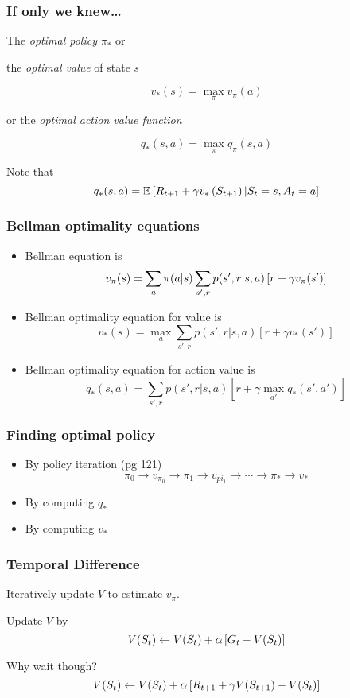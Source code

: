 \documentclass{beamer}
\begin{document}
\frame
{
   \frametitle{If only we knew\dots}
  
   The \textit{optimal policy} $\pi_*$ or
   
   the \textit{optimal value} of state $s$
   
   $$v_* (s) = \max_\pi v_\pi(a)$$
   
   or the \textit{optimal action value function}
   
   $$q_*(s, a) = \max_\pi q_\pi(s, a)$$
   
   Note that
   $$q_*(s, a) = \mathbb{E} \left[{R_{t+1} + \gamma v_* \left({S_{t+1}}\right) | S_t = s, A_t=a}\right]$$ 
}

\frame
{
   \frametitle{Bellman optimality equations}
   
   \begin{itemize}
      \item<1-> Bellman equation is 
      $$v_\pi(s) = \sum_a \pi(a|s) \sum_{s',r} p(s',r| s, a) \left[{r + \gamma v_\pi(s')}\right]$$
      
      \item<2-> Bellman optimality equation for value is
      $$v_*(s) = \max_a \sum_{s', r} p(s', r| s, a) [r + \gamma v_*(s')]$$
      
      \item<3-> Bellman optimality equation for action value is
      $$q_*(s,a) = \sum_{s', r} p(s', r| s, a) [r +  \gamma \max_{a'} q_*(s', a')]$$
      
   \end{itemize}
}

\frame
{
   \frametitle{Finding optimal policy}
   
   \begin{itemize}
      \item<1-> By policy iteration (pg 121)
      $$\pi_0 \to v_{\pi_0} \to \pi_1 \to v_{pi_1} \to \cdots \to \pi_* \to v_*$$
      
      \item<2-> By computing $q_*$
      
      \item<3-> By computing $v_*$
      
   \end{itemize}
}

\frame
{
   \frametitle{Temporal Difference}
   Iteratively update $V$ to estimate $v_\pi$.   
   
   Update $V$ by
   $$V(S_t) \leftarrow V(S_t) + \alpha \left[{G_t - V(S_t)}\right]$$
   
   Why wait though?
   $$V(S_t) \leftarrow V(S_t) + \alpha \left[{R_{t+1} + \gamma V(S_{t+1}) - V(S_t)}\right]$$
}
\end{document}
